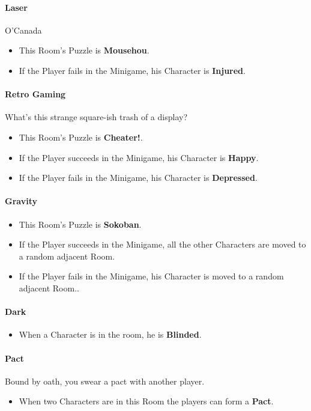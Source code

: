 \paragraph{Laser} O'Canada
\begin{itemize}
	\item This Room's Puzzle is \textbf{Mousehou}.
	\item If the Player fails    in the Minigame, his Character is \textbf{Injured}.
\end{itemize}

\paragraph{Retro Gaming} What's this strange square-ish trash of a display?
\begin{itemize}
	\item This Room's Puzzle is \textbf{Cheater!}.
	\item If the Player succeeds in the Minigame, his Character is \textbf{Happy}.
	\item If the Player fails    in the Minigame, his Character is \textbf{Depressed}.
\end{itemize}

\paragraph{Gravity} 
\begin{itemize}
	\item This Room's Puzzle is \textbf{Sokoban}.
	\item If the Player succeeds in the Minigame, all the other Characters are moved to a random adjacent Room.
	\item If the Player fails    in the Minigame, his Character is moved to a random adjacent Room..
\end{itemize}

\paragraph{Dark} 
\begin{itemize}
	\item When a Character is in the room, he is \textbf{Blinded}.
\end{itemize}

\paragraph{Pact} Bound by oath, you swear a pact with another player. 
\begin{itemize}
	\item When two Characters are in this Room the players can form a \textbf{Pact}.
\end{itemize}


